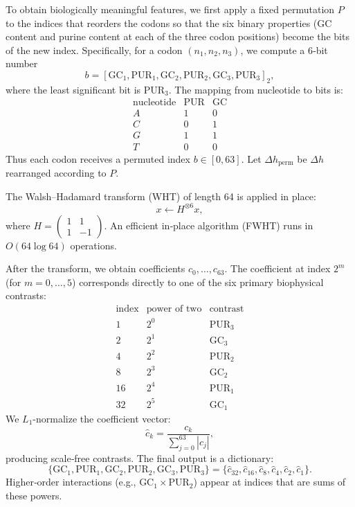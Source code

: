 \documentclass[12pt]{article}
\begin{document}
To obtain biologically meaningful features, we first apply a fixed permutation $P$ to the indices that reorders the codons so that the six binary properties (GC content and purine content at each of the three codon positions) become the bits of the new index. Specifically, for a codon $(n_1,n_2,n_3)$, we compute a 6‑bit number
\[
b = [\text{GC}_1,\text{PUR}_1,\text{GC}_2,\text{PUR}_2,\text{GC}_3,\text{PUR}_3]_2,
\]
where the least significant bit is $\text{PUR}_3$. The mapping from nucleotide to bits is:
\[
\begin{array}{c|cc}
\text{nucleotide} & \text{PUR} & \text{GC} \\ \hline
A & 1 & 0 \\
C & 0 & 1 \\
G & 1 & 1 \\
T & 0 & 0
\end{array}
\]
Thus each codon receives a permuted index $b \in [0,63]$. Let $\Delta h_{\text{perm}}$ be $\Delta h$ rearranged according to $P$.

The Walsh–Hadamard transform (WHT) of length 64 is applied in place:
\[
x \gets H^{\otimes 6} x,
\]
where $H = \begin{pmatrix}1&1\\1&-1\end{pmatrix}$. An efficient in‑place algorithm (FWHT) runs in $O(64\log 64)$ operations.

After the transform, we obtain coefficients $c_0,\dots,c_{63}$. The coefficient at index $2^m$ (for $m=0,\dots,5$) corresponds directly to one of the six primary biophysical contrasts:
\[
\begin{array}{c|c|c}
\text{index} & \text{power of two} & \text{contrast} \\ \hline
1 & 2^0 & \text{PUR}_3 \\
2 & 2^1 & \text{GC}_3 \\
4 & 2^2 & \text{PUR}_2 \\
8 & 2^3 & \text{GC}_2 \\
16 & 2^4 & \text{PUR}_1 \\
32 & 2^5 & \text{GC}_1
\end{array}
\]
We $L_1$-normalize the coefficient vector:
\[
\hat{c}_k = \frac{c_k}{\sum_{j=0}^{63} |c_j|},
\]
producing scale‑free contrasts. The final output is a dictionary:
\[
\{\text{GC}_1,\text{PUR}_1,\text{GC}_2,\text{PUR}_2,\text{GC}_3,\text{PUR}_3\} = \{\hat{c}_{32},\hat{c}_{16},\hat{c}_8,\hat{c}_4,\hat{c}_2,\hat{c}_1\}.
\]
Higher‑order interactions (e.g., GC$_1\times$PUR$_2$) appear at indices that are sums of these powers.
\end{document}
